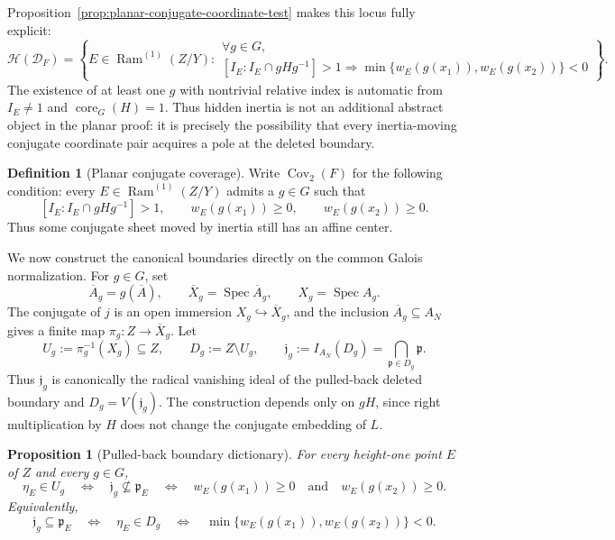\documentclass[11pt]{article}
\newtheorem{proposition}[theorem]{Proposition}
\theoremstyle{remark}
\theoremstyle{definition}
\newtheorem{definition}[theorem]{Definition}
\DeclareMathOperator{\Spec}{Spec}
\DeclareMathOperator{\Ram}{Ram}
\DeclareMathOperator{\core}{core}
\begin{document}
Proposition~\ref{prop:planar-conjugate-coordinate-test} makes this locus
fully explicit:
\[
  \mathcal H(\mathcal D_F)
  =
  \left\{
  E\in\Ram^{(1)}(Z/Y):
  \begin{array}{l}
    \forall g\in G,\\[-2pt]
    [I_E:I_E\cap gHg^{-1}]>1
    \Longrightarrow
    \min\{w_E(g(x_1)),w_E(g(x_2))\}<0
  \end{array}
  \right\}.
\]
The existence of at least one \(g\) with nontrivial relative index is
automatic from \(I_E\neq1\) and \(\core_G(H)=1\).  Thus hidden inertia is
not an additional abstract object in the planar proof: it is precisely the
possibility that every inertia-moving conjugate coordinate pair acquires a
pole at the deleted boundary.

\begin{definition}[Planar conjugate coverage]
\label{def:planar-conjugate-coverage}
Write \(\operatorname{Cov}_2(F)\) for the following condition: every
\(E\in\Ram^{(1)}(Z/Y)\) admits a \(g\in G\) such that
\[
  [I_E:I_E\cap gHg^{-1}]>1,
  \qquad
  w_E(g(x_1))\geq0,
  \qquad
  w_E(g(x_2))\geq0.
\]
Thus some conjugate sheet moved by inertia still has an affine center.
\end{definition}

We now construct the canonical boundaries directly on the common Galois
normalization.  For \(g\in G\), set
\[
  \overline A_g=g(\overline A),
  \qquad
  \overline X_g=\Spec\overline A_g,
  \qquad
  X_g=\Spec A_g.
\]
The conjugate of \(j\) is an open immersion
\(X_g\hookrightarrow\overline X_g\), and the inclusion
\(\overline A_g\subseteq A_N\) gives a finite map
\(\pi_g\colon Z\to\overline X_g\).  Let
\[
  U_g:=\pi_g^{-1}(X_g)\subseteq Z,
  \qquad
  D_g:=Z\setminus U_g,
  \qquad
  \mathfrak j_g:=
    I_{A_N}(D_g)
    =
    \bigcap_{\mathfrak p\in D_g}\mathfrak p.
\]
Thus \(\mathfrak j_g\) is canonically the radical vanishing ideal of the
pulled-back deleted boundary and \(D_g=V(\mathfrak j_g)\).  The
construction depends only on \(gH\), since right multiplication by \(H\)
does not change the conjugate embedding of \(L\).

\begin{proposition}[Pulled-back boundary dictionary]
\label{prop:pulled-back-boundary-dictionary}
For every height-one point \(E\) of \(Z\) and every \(g\in G\),
\[
  \eta_E\in U_g
  \quad\Longleftrightarrow\quad
  \mathfrak j_g\nsubseteq\mathfrak p_E
  \quad\Longleftrightarrow\quad
  w_E(g(x_1))\geq0
  \quad\text{and}\quad
  w_E(g(x_2))\geq0.
\]
Equivalently,
\[
  \mathfrak j_g\subseteq\mathfrak p_E
  \quad\Longleftrightarrow\quad
  \eta_E\in D_g
  \quad\Longleftrightarrow\quad
  \min\{w_E(g(x_1)),w_E(g(x_2))\}<0.
\]
\end{proposition}
\end{document}
